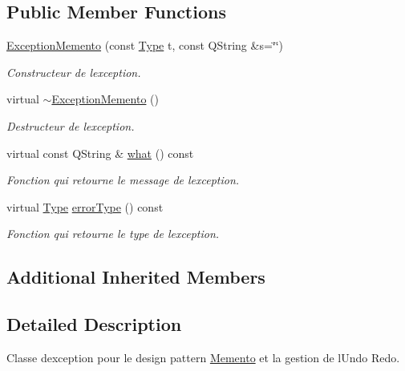 \subsection*{Public Member Functions}
\begin{DoxyCompactItemize}
\item 
\hyperlink{class_exception_memento_a1e94b6bb22c1b90247a40729d7ac3271}{Exception\+Memento} (const \hyperlink{class_exception_memento_a83ec20464c7ba61569afeb4477f1504e}{Type} t, const Q\+String \&s=\char`\"{}\char`\"{})
\begin{DoxyCompactList}\small\item\em Constructeur de l\textquotesingle{}exception. \end{DoxyCompactList}\item 
virtual \hyperlink{class_exception_memento_ac3f0964c8f4ac3c1ac7fa58a96ade038}{$\sim$\+Exception\+Memento} ()\hypertarget{class_exception_memento_ac3f0964c8f4ac3c1ac7fa58a96ade038}{}\label{class_exception_memento_ac3f0964c8f4ac3c1ac7fa58a96ade038}

\begin{DoxyCompactList}\small\item\em Destructeur de l\textquotesingle{}exception. \end{DoxyCompactList}\item 
virtual const Q\+String \& \hyperlink{class_exception_memento_a75c501d8bf4bd3bad2e3fb7bf17c778d}{what} () const 
\begin{DoxyCompactList}\small\item\em Fonction qui retourne le message de l\textquotesingle{}exception. \end{DoxyCompactList}\item 
virtual \hyperlink{class_exception_memento_a83ec20464c7ba61569afeb4477f1504e}{Type} \hyperlink{class_exception_memento_a1a09d1650a93d2b54fd2e167a6968b1b}{error\+Type} () const 
\begin{DoxyCompactList}\small\item\em Fonction qui retourne le type de l\textquotesingle{}exception. \end{DoxyCompactList}\end{DoxyCompactItemize}
\subsection*{Additional Inherited Members}


\subsection{Detailed Description}
Classe d\textquotesingle{}exception pour le design pattern \hyperlink{class_memento}{Memento} et la gestion de l\textquotesingle{}Undo Redo. 

